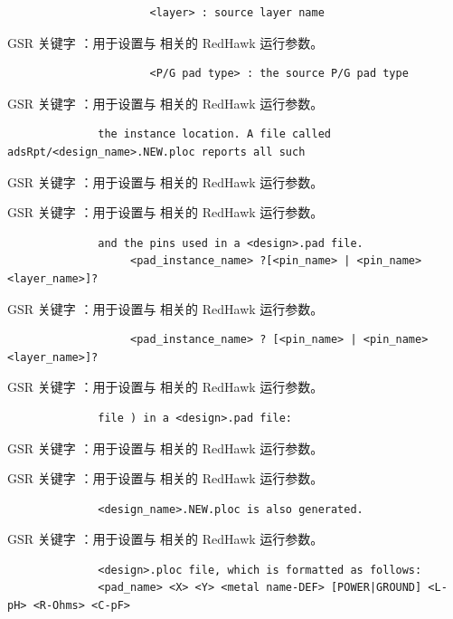 \begin{lstlisting}
                      <layer> : source layer name
\end{lstlisting}

GSR 关键字 ：用于设置与  相关的 RedHawk 运行参数。

\begin{lstlisting}
                      <P/G pad type> : the source P/G pad type
\end{lstlisting}

GSR 关键字 ：用于设置与  相关的 RedHawk 运行参数。

\begin{lstlisting}
              the instance location. A file called adsRpt/<design_name>.NEW.ploc reports all such
\end{lstlisting}

GSR 关键字 ：用于设置与  相关的 RedHawk 运行参数。

GSR 关键字 ：用于设置与  相关的 RedHawk 运行参数。

\begin{lstlisting}
              and the pins used in a <design>.pad file.
                   <pad_instance_name> ?[<pin_name> | <pin_name> <layer_name>]?
\end{lstlisting}

GSR 关键字 ：用于设置与  相关的 RedHawk 运行参数。

\begin{lstlisting}
                   <pad_instance_name> ? [<pin_name> | <pin_name> <layer_name>]?
\end{lstlisting}

GSR 关键字 ：用于设置与  相关的 RedHawk 运行参数。

\begin{lstlisting}
              file ) in a <design>.pad file:
\end{lstlisting}

GSR 关键字 ：用于设置与  相关的 RedHawk 运行参数。

GSR 关键字 ：用于设置与  相关的 RedHawk 运行参数。

\begin{lstlisting}
              <design_name>.NEW.ploc is also generated.
\end{lstlisting}

GSR 关键字 ：用于设置与  相关的 RedHawk 运行参数。

\begin{lstlisting}
              <design>.ploc file, which is formatted as follows:
              <pad_name> <X> <Y> <metal name-DEF> [POWER|GROUND] <L-pH> <R-Ohms> <C-pF>
\end{lstlisting}

